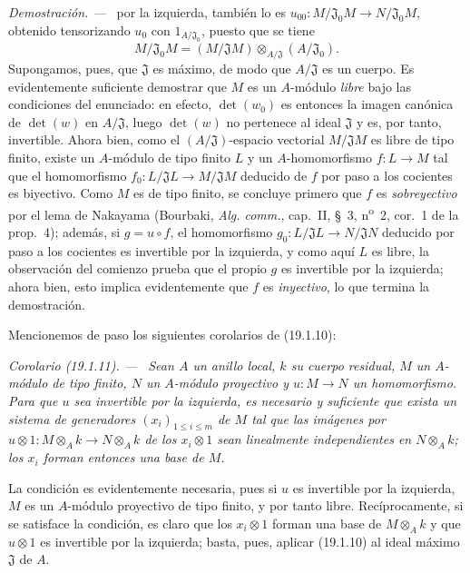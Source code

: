 \documentclass[10pt,oneside]{book}
\makeatletter
\newcommand{\setmanualcurrentlabel}[1]{\def\@currentlabel{#1}}
\newenvironment{corollary}[1][]{%
  \setmanualcurrentlabel{#1}\par\medskip\noindent\itshape Corolario (#1). ---\ }{\par}
\newenvironment{proof}{%
  \par\medskip\noindent\textit{Demostración. ---\ }}{\par}
\makeatother
\begin{document}
\begin{proof}
por la izquierda, también lo es
$u_{00}:M/\mathfrak J_0M\to N/\mathfrak J_0M$, obtenido tensorizando $u_0$ con
$1_{A/\mathfrak J_0}$, puesto que se tiene
\[
  M/\mathfrak J_0M=(M/\mathfrak JM)\otimes_{A/\mathfrak J}(A/\mathfrak J_0).
\]
Supongamos, pues, que $\mathfrak J$ es máximo, de modo que $A/\mathfrak J$ es
un cuerpo. Es evidentemente suficiente demostrar que $M$ es un $A$-módulo
\emph{libre} bajo las condiciones del enunciado: en efecto, $\det(w_0)$ es
entonces la imagen canónica de $\det(w)$ en $A/\mathfrak J$, luego $\det(w)$
no pertenece al ideal $\mathfrak J$ y es, por tanto, invertible. Ahora bien,
como el $(A/\mathfrak J)$-espacio vectorial $M/\mathfrak JM$ es libre de tipo
finito, existe un $A$-módulo de tipo finito $L$ y un $A$-homomorfismo $f:L\to M$
tal que el homomorfismo $f_0:L/\mathfrak JL\to M/\mathfrak JM$ deducido de $f$
por paso a los cocientes es biyectivo. Como $M$ es de tipo finito, se concluye
primero que $f$ es \emph{sobreyectivo} por el lema de Nakayama (Bourbaki,
\emph{Alg. comm.}, cap.~II, §~3, n\textsuperscript{o}~2, cor.~1 de la
prop.~4); además, si $g=u\circ f$, el homomorfismo
$g_0:L/\mathfrak JL\to N/\mathfrak JN$ deducido por paso a los cocientes es
invertible por la izquierda, y como aquí $L$ es libre, la observación del
comienzo prueba que el propio $g$ es invertible por la izquierda; ahora bien,
esto implica evidentemente que $f$ es \emph{inyectivo}, lo que termina la demostración.
\end{proof}

Mencionemos de paso los siguientes corolarios de (19.1.10):

\begin{corollary}[19.1.11]
\label{0.19.1.11-es}
Sean $A$ un anillo local, $k$ su cuerpo residual, $M$ un $A$-módulo de tipo
finito, $N$ un $A$-módulo proyectivo y $u:M\to N$ un homomorfismo. Para que
$u$ sea invertible por la izquierda, es necesario y suficiente que exista un
sistema de generadores $(x_i)_{1\leq i\leq m}$ de $M$ tal que las imágenes por
$u\otimes 1:M\otimes_Ak\to N\otimes_Ak$ de los $x_i\otimes1$ sean linealmente
independientes en $N\otimes_Ak$; los $x_i$ forman entonces una base de $M$.
\end{corollary}

La condición es evidentemente necesaria, pues si $u$ es invertible por la
izquierda, $M$ es un $A$-módulo proyectivo de tipo finito, y por tanto libre.
Recíprocamente, si se satisface la condición, es claro que los $x_i\otimes1$
forman una base de $M\otimes_Ak$ y que $u\otimes1$ es invertible por la
izquierda; basta, pues, aplicar (19.1.10) al ideal máximo $\mathfrak J$ de $A$.
\end{document}
